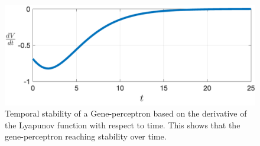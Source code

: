 \documentclass[twocolumn]{biophys-new}
\begin{document}
{{%

\begin{figure}[ht!] %
\centering
\includegraphics[width=\linewidth]{figures/dVdT_lypunov.pdf}
\caption{Temporal stability of a Gene-perceptron based on  the derivative of the Lyapunov function with respect to time. This shows that the gene-perceptron reaching stability over time.\vspace{-1em}}
\label{lypunov_vs_t}
\vspace{-0.5em}
\end{figure}














        














}}
\end{document}
